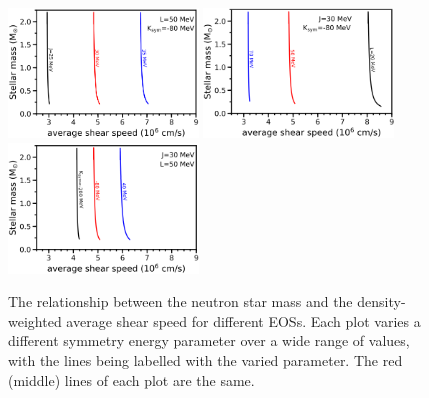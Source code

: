 \documentclass[fleqn,usenatbib]{mnras}
\begin{document}


\begin{figure}
\centering
\includegraphics[width=0.45\textwidth,angle=0]{Mcts_Jvals.png}
\includegraphics[width=0.45\textwidth,angle=0]{Mcts_Lvals.png}
\includegraphics[width=0.45\textwidth,angle=0]{Mcts_Kvals.png}
\caption{The relationship between the neutron star mass and the density-weighted average shear speed for different EOSs. Each plot varies a different symmetry energy parameter over a wide range of values, with the lines being labelled with the varied parameter. The red (middle) lines of each plot are the same.}
\label{fig:Mct_JLK}
\end{figure}

\end{document}
